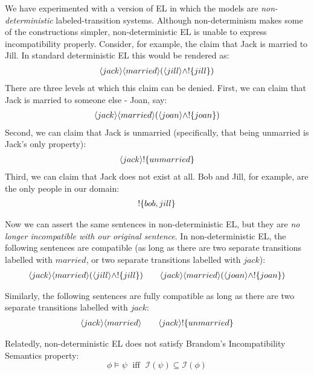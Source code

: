 We have experimented with a version of EL in which the models are
\emph{non-deterministic} labeled-transition systems.  Although
non-determinism makes some of the constructions simpler,
non-deterministic EL is unable to express incompatibility properly.
Consider, for example, the claim that Jack is married to Jill. 
In standard deterministic EL this would be rendered as:
\begin{eqnarray*}
  \langle jack \rangle \langle married \rangle (\langle jill \rangle \land ! \{jill\})
\end{eqnarray*}
There are three levels at which this claim can be denied.
First, we can claim that Jack is married to someone else - Joan, say:
\begin{eqnarray*}
   \langle jack \rangle \langle married \rangle (\langle joan \rangle \land ! \{joan\})
\end{eqnarray*}
Second, we can claim that Jack is unmarried (specifically, that being unmarried is Jack's only property):
\begin{eqnarray*}
  \langle jack \rangle !\{unmarried\}
\end{eqnarray*}
Third, we can claim that Jack does not exist at all. Bob and Jill, for example, are the only people in our domain:
\begin{eqnarray*}
  ! \{bob, jill\}
\end{eqnarray*}

Now we can assert the same sentences in non-deterministic EL, but they
are \emph{no longer incompatible with our original sentence}.  In
non-deterministic EL, the following sentences are compatible (as long
as there are two separate transitions labelled with $married$, or two
separate transitions labelled with $jack$):
\begin{eqnarray*}
  \langle jack \rangle \langle married \rangle (\langle jill \rangle \land ! \{jill\}) 
      \qquad
  \langle jack \rangle \langle married \rangle (\langle joan \rangle \land ! \{joan\})
\end{eqnarray*}

\NI Similarly, the following sentences are fully compatible as long as
there are two separate transitions labelled with $jack$:
\begin{eqnarray*}
  \langle jack \rangle \langle married \rangle \qquad
  \langle jack \rangle ! \{unmarried\}
\end{eqnarray*}

\NI Relatedly, non-deterministic EL does not satisfy Brandom's
Incompatibility Semantics property:
\[
   \phi \models \psi \; \mbox{ iff } \; \mathcal{I}(\psi) \subseteq \mathcal{I}(\phi)
\]

